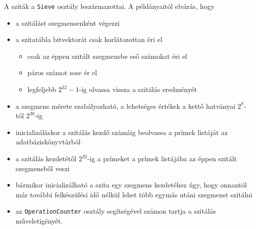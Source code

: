 A sziták a \texttt{Sieve} osztály leszármazottai.
A példányaitól elvárás, hogy
\begin{itemize}
\item a szitálást szegmensenként végezzi
\item a szitatábla bitvektorát csak korlátozottan éri el
\begin{itemize}
\item csak az éppen szitált szegmensbe eső számokat éri el
\item páros számot sose ér el
\item legfeljebb $2^{32}-1$-ig olvassa vissza a szitálás eredményét
\end{itemize}
\item a szegmens mérete szabályozható, a lehetséges értékek a kettő hatványai $2^8$-tól $2^{30}$-ig 
\item inicializáláskor a szitálás kezdő számáig beolvassa a prímek listáját az adatbáziskönyvtárból
\item a szitálás kezdetétől $2^{32}$-ig a prímeket a prímek listájába az éppen szitált szegmensből veszi
\item bármikor inicializálható a szita egy szegmens kezdetéhez úgy, hogy onnantól már további felkészülési idő nélkül lehet több egymás utáni szegmenst szitálni
\item az \texttt{OperationCounter} osztály segítségével számon tartja a szitálás műveletigényét.
\end{itemize}

